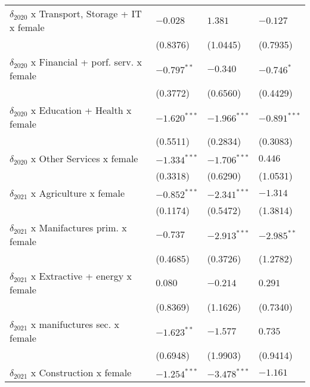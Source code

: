 \begin{tabular}{llll}
$\delta_{2020}$ x Transport, Storage + IT x female &           $-0.028$ &            $1.381$ &           $-0.127$ \\
                                                   &           (0.8376) &           (1.0445) &           (0.7935) \\
$\delta_{2020}$ x Financial + porf. serv. x female &      $-0.797^{**}$ &           $-0.340$ &         $-0.746^*$ \\
                                                   &           (0.3772) &           (0.6560) &           (0.4429) \\
$\delta_{2020}$ x Education + Health x female      &     $-1.620^{***}$ &     $-1.966^{***}$ &     $-0.891^{***}$ \\
                                                   &           (0.5511) &           (0.2834) &           (0.3083) \\
$\delta_{2020}$ x Other Services x female          &     $-1.334^{***}$ &     $-1.706^{***}$ &            $0.446$ \\
                                                   &           (0.3318) &           (0.6290) &           (1.0531) \\
$\delta_{2021}$ x Agriculture x female             &     $-0.852^{***}$ &     $-2.341^{***}$ &           $-1.314$ \\
                                                   &           (0.1174) &           (0.5472) &           (1.3814) \\
$\delta_{2021}$ x Manifactures prim. x female      &           $-0.737$ &     $-2.913^{***}$ &      $-2.985^{**}$ \\
                                                   &           (0.4685) &           (0.3726) &           (1.2782) \\
$\delta_{2021}$ x Extractive + energy x female     &            $0.080$ &           $-0.214$ &            $0.291$ \\
                                                   &           (0.8369) &           (1.1626) &           (0.7340) \\
$\delta_{2021}$ x manifuctures sec. x female       &      $-1.623^{**}$ &           $-1.577$ &            $0.735$ \\
                                                   &           (0.6948) &           (1.9903) &           (0.9414) \\
$\delta_{2021}$ x Construction x female            &     $-1.254^{***}$ &     $-3.478^{***}$ &           $-1.161$ \\

\end{tabular}
